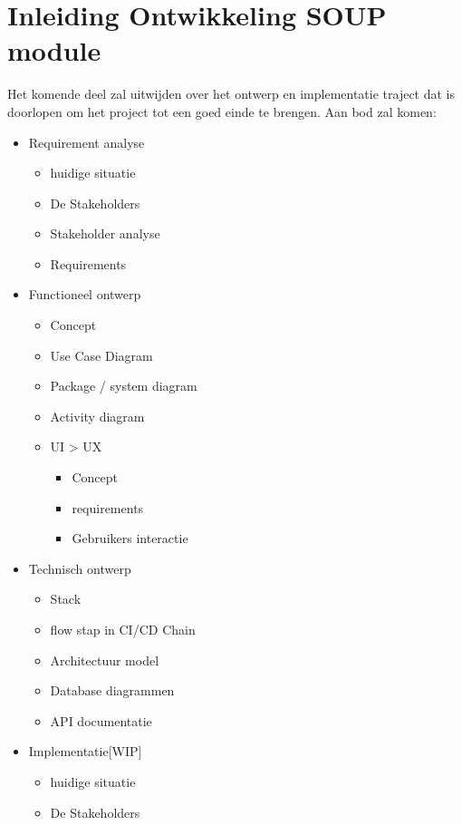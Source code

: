 
\chapter{Inleiding Ontwikkeling SOUP module}\label{ch:inleiding-ontwikkeling-soup-module} %


Het komende deel zal uitwijden over het ontwerp en implementatie traject dat is doorlopen om het project tot een goed einde te brengen. Aan bod zal komen:
\begin{itemize}
  \item Requirement analyse
  \begin{itemize}
    \item huidige situatie
    \item De Stakeholders
    \item Stakeholder analyse
    \item Requirements
  \end{itemize}
  \item Functioneel ontwerp
  \begin{itemize}
    \item Concept
    \item Use Case Diagram
    \item Package / system diagram
    \item Activity diagram
    \item UI > UX
    \begin{itemize}
      \item Concept
      \item requirements
      \item Gebruikers interactie
    \end{itemize}
  \end{itemize}
  \item Technisch ontwerp
  \begin{itemize}
    \item Stack
    \item flow stap in CI/CD Chain
    \item Architectuur model
    \item Database diagrammen
    \item API documentatie
  \end{itemize}
  \item Implementatie[WIP]
  \begin{itemize}
    \item huidige situatie
    \item De Stakeholders

\end{itemize}
\end{itemize}
